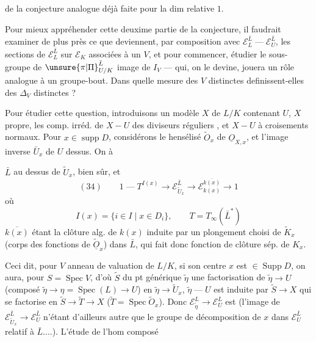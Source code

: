 de la conjecture analogue déjà faite pour la dim relative $1$.

Pour mieux appréhender cette deuxime partie  de la conjecture, il faudrait examiner de plus près ce que deviennent, par composition avec $\mathcal E_L^{\bar L}\mathrel{\text{---}}\mathcal E_U^{\bar L}$, les sections de $\mathcal E_L^{\bar L}$ sur $\mathcal E_K$ associées à un $V$, et pour commencer, étudier le sous-groupe  de $\unsure{\pi|\Pi}_{U/K}^{\bar L}$ image de $I_V$ --- qui, on le devine, jouera un rôle analogue à un groupe-bout. Dans quelle mesure des $V$ distinctes definissent-elles des $\Delta_V$ distinctes ?

Pour étudier cette question, introduisons un modèle $X$ de $L/K$ contenant $U$, $X$ propre, les comp. irréd. de  $X-U$ des diviseurs réguliers , et $X-U$ à croisements normaux. Pour $x\in\operatorname{supp}D$, considérons le hensélisé  $\tilde O_x$ de $\underline{O}_{X,x}$, et l'image inverse $\bar U_x$ de $U$ dessus. On à

$\bar L$ au dessus de $\tilde U_x$, bien sûr, et
\[
 (34)\qquad
 1\mathrel{\text{---}}T^{I(x)}\longrightarrow
 \mathcal E_{\tilde U_x}^{\bar L}\longrightarrow
 \mathcal E_{k(x)}^{\overline{k(x)}}\longrightarrow 1
\]
où 
\[
 I(x)=\{i\in I\mid x\in D_i\},\qquad T=T_\infty(\bar L^*)
\]
$\overline{k(x)}$ étant la clôture alg. de $k(x)$ induite par un plongement choisi de $\tilde K_x$ (corps des fonctions de $\widetilde{\underline{O}}_x$) dans $\bar L$, qui fait donc fonction  de clôture sép. de $K_x$.

Ceci dit, pour $V$ anneau de valuation de $L/K$, si son centre $x$  est $\in\operatorname{Supp}D$, on aura, pour $S=\operatorname{Spec}V$, d'où $\tilde S$  du pt générique $\tilde\eta$ une factorisation de $\tilde\eta\longrightarrow U$ (composé $\tilde\eta\longrightarrow\eta=\operatorname{Spec}(L)\longrightarrow U$) en $\tilde\eta\longrightarrow\tilde U_x$,  $\tilde\eta\mathrel{\text{---}}U$ est induite par $\tilde S\longrightarrow X$ qui se factorise en $\tilde S\longrightarrow\tilde T\longrightarrow X$ ($\tilde T=\operatorname{Spec}\tilde O_x$). Donc   $\mathcal E_{\tilde\eta}^{L}\longrightarrow\mathcal E_U^{L}$ est  
(l'image de $\mathcal E_{\tilde U_x}^{\bar L}\longrightarrow\mathcal E_U^{\bar L}$ n'étant d'ailleurs autre que le groupe de décomposition de $x$ dans $\mathcal E_U^{\bar L}$ relatif à $\bar L$....). L'étude de l'hom composé
